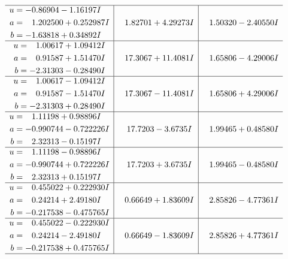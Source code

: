 \documentclass[1p]{elsarticle_modified}
\theoremstyle{definition}
\begin{document}
$$\begin{array}{c|c|c}
 \hline 
\begin{aligned}
u &= -0.86904 - 1.16197 I \\
a &= \phantom{-}1.202500 + 0.252987 I \\
b &= -1.63818 + 0.34892 I\end{aligned}
 & \phantom{-}1.82701 + 4.29273 I & \phantom{-}1.50320 - 2.40550 I \\ \hline\begin{aligned}
u &= \phantom{-}1.00617 + 1.09412 I \\
a &= \phantom{-}0.91587 + 1.51470 I \\
b &= -2.31303 - 0.28490 I\end{aligned}
 & \phantom{-}17.3067 + 11.4081 I & \phantom{-}1.65806 - 4.29006 I \\ \hline\begin{aligned}
u &= \phantom{-}1.00617 - 1.09412 I \\
a &= \phantom{-}0.91587 - 1.51470 I \\
b &= -2.31303 + 0.28490 I\end{aligned}
 & \phantom{-}17.3067 - 11.4081 I & \phantom{-}1.65806 + 4.29006 I \\ \hline\begin{aligned}
u &= \phantom{-}1.11198 + 0.98896 I \\
a &= -0.990744 - 0.722226 I \\
b &= \phantom{-}2.32313 - 0.15197 I\end{aligned}
 & \phantom{-}17.7203 - 3.6735 I & \phantom{-}1.99465 + 0.48580 I \\ \hline\begin{aligned}
u &= \phantom{-}1.11198 - 0.98896 I \\
a &= -0.990744 + 0.722226 I \\
b &= \phantom{-}2.32313 + 0.15197 I\end{aligned}
 & \phantom{-}17.7203 + 3.6735 I & \phantom{-}1.99465 - 0.48580 I \\ \hline\begin{aligned}
u &= \phantom{-}0.455022 + 0.222930 I \\
a &= \phantom{-}0.24214 + 2.49180 I \\
b &= -0.217538 - 0.475765 I\end{aligned}
 & \phantom{-}0.66649 + 1.83609 I & \phantom{-}2.85826 - 4.77361 I \\ \hline\begin{aligned}
u &= \phantom{-}0.455022 - 0.222930 I \\
a &= \phantom{-}0.24214 - 2.49180 I \\
b &= -0.217538 + 0.475765 I\end{aligned}
 & \phantom{-}0.66649 - 1.83609 I & \phantom{-}2.85826 + 4.77361 I\\
 \hline 
 \end{array}$$\newpage\newpage\renewcommand{\arraystretch}{1}
\end{document}
